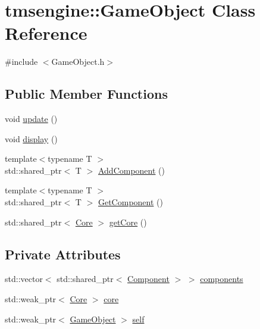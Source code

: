 \hypertarget{classtmsengine_1_1_game_object}{}\section{tmsengine\+:\+:Game\+Object Class Reference}
\label{classtmsengine_1_1_game_object}


{\ttfamily \#include $<$Game\+Object.\+h$>$}

\subsection*{Public Member Functions}
\begin{DoxyCompactItemize}
\item 
void \hyperlink{classtmsengine_1_1_game_object_adde904518de57fa132493e07b7b0cda7}{update} ()
\item 
void \hyperlink{classtmsengine_1_1_game_object_af94d4e76cf2aa823071178132ecf1060}{display} ()
\item 
{\footnotesize template$<$typename T $>$ }\\std\+::shared\+\_\+ptr$<$ T $>$ \hyperlink{classtmsengine_1_1_game_object_a55aab957aab04d2fd400a03f4c32dfee}{Add\+Component} ()
\item 
{\footnotesize template$<$typename T $>$ }\\std\+::shared\+\_\+ptr$<$ T $>$ \hyperlink{classtmsengine_1_1_game_object_a6100faa614234f00062074ef31be7bc3}{Get\+Component} ()
\item 
std\+::shared\+\_\+ptr$<$ \hyperlink{classtmsengine_1_1_core}{Core} $>$ \hyperlink{classtmsengine_1_1_game_object_abcaf58a2195a319064266cbac0bf74d6}{get\+Core} ()
\end{DoxyCompactItemize}
\subsection*{Private Attributes}
\begin{DoxyCompactItemize}
\item 
std\+::vector$<$ std\+::shared\+\_\+ptr$<$ \hyperlink{classtmsengine_1_1_component}{Component} $>$ $>$ \hyperlink{classtmsengine_1_1_game_object_a94c0947df66676bfce83cd1d28ef8a32}{components}
\item 
std\+::weak\+\_\+ptr$<$ \hyperlink{classtmsengine_1_1_core}{Core} $>$ \hyperlink{classtmsengine_1_1_game_object_ae7f1027d4e1fdc66ec0a5d383136165b}{core}
\item 
std\+::weak\+\_\+ptr$<$ \hyperlink{classtmsengine_1_1_game_object}{Game\+Object} $>$ \hyperlink{classtmsengine_1_1_game_object_a5b74bdb7c894b24eaf4ef56610b5f2e6}{self}
\end{DoxyCompactItemize}
